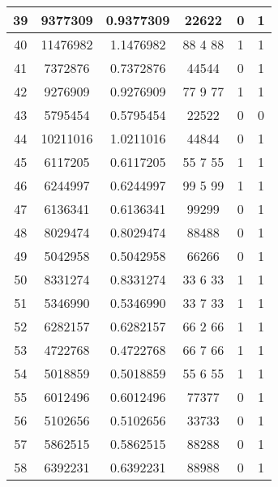 \documentclass{jlreq}
\numberwithin{equation}{section}
\begin{document}
\begin{table}[H]
{\begin{tabular}{|c|c|c|c|c|c|}
      39           & 9377309          & 0.9377309      & 22622       & 0     & 1   \\ \hline
      40           & 11476982         & 1.1476982      & 88   4   88 & 1     & 1   \\ \hline
      41           & 7372876          & 0.7372876      & 44544       & 0     & 1   \\ \hline
      42           & 9276909          & 0.9276909      & 77   9   77 & 1     & 1   \\ \hline
      43           & 5795454          & 0.5795454      & 22522       & 0     & 0   \\ \hline
      44           & 10211016         & 1.0211016      & 44844       & 0     & 1   \\ \hline
      45           & 6117205          & 0.6117205      & 55   7   55 & 1     & 1   \\ \hline
      46           & 6244997          & 0.6244997      & 99   5   99 & 1     & 1   \\ \hline
      47           & 6136341          & 0.6136341      & 99299       & 0     & 1   \\ \hline
      48           & 8029474          & 0.8029474      & 88488       & 0     & 1   \\ \hline
      49           & 5042958          & 0.5042958      & 66266       & 0     & 1   \\ \hline
      50           & 8331274          & 0.8331274      & 33   6   33 & 1     & 1   \\ \hline
      51           & 5346990          & 0.5346990      & 33   7   33 & 1     & 1   \\ \hline
      52           & 6282157          & 0.6282157      & 66   2   66 & 1     & 1   \\ \hline
      53           & 4722768          & 0.4722768      & 66   7   66 & 1     & 1   \\ \hline
      54           & 5018859          & 0.5018859      & 55   6   55 & 1     & 1   \\ \hline
      55           & 6012496          & 0.6012496      & 77377       & 0     & 1   \\ \hline
      56           & 5102656          & 0.5102656      & 33733       & 0     & 1   \\ \hline
      57           & 5862515          & 0.5862515      & 88288       & 0     & 1   \\ \hline
      58           & 6392231          & 0.6392231      & 88988       & 0     & 1   \\ \hline

\end{tabular}}
\end{table}
\end{document}
